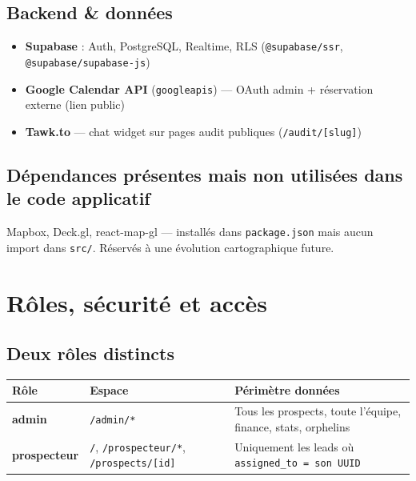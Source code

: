 \documentclass[11pt,a4paper]{report}
\begin{document}
\section{Backend \& données}

\begin{itemize}[noitemsep]
  \item \textbf{Supabase} : Auth, PostgreSQL, Realtime, RLS (\texttt{@supabase/ssr}, \texttt{@supabase/supabase-js})
  \item \textbf{Google Calendar API} (\texttt{googleapis}) --- OAuth admin + réservation externe (lien public)
  \item \textbf{Tawk.to} --- chat widget sur pages audit publiques (\texttt{/audit/[slug]})
\end{itemize}

\section{Dépendances présentes mais non utilisées dans le code applicatif}

Mapbox, Deck.gl, react-map-gl --- installés dans \texttt{package.json} mais aucun import dans \texttt{src/}. Réservés à une évolution cartographique future.

\chapter{Rôles, sécurité et accès}

\section{Deux rôles distincts}

\begin{table}[h]
\centering
\begin{tabular}{@{}p{3cm}p{5cm}p{6cm}@{}}
\toprule
\textbf{Rôle} & \textbf{Espace} & \textbf{Périmètre données} \\
\midrule
\textcolor{admincolor}{\textbf{admin}} &
\texttt{/admin/*} &
Tous les prospects, toute l'équipe, finance, stats, orphelins \\
\textcolor{proscolor}{\textbf{prospecteur}} &
\texttt{/}, \texttt{/prospecteur/*}, \texttt{/prospects/[id]} &
Uniquement les leads où \texttt{assigned\_to = son UUID} \\
\bottomrule
\end{tabular}
\end{table}
\end{document}
